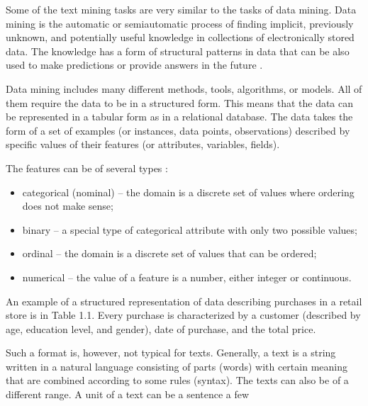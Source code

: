 Some of the text mining tasks are very similar to the tasks of data mining.
Data mining is the automatic or semiautomatic process of finding implicit, previously unknown, and potentially useful knowledge in collections of electronically
stored data. The knowledge has a form of structural patterns in data that can be
also used to make predictions or provide answers in the future \cite{ref280}.

Data mining includes many different methods, tools, algorithms, or models.
All of them require the data to be in a structured form. This means that the data
can be represented in a tabular form as in a relational database. The data takes
the form of a set of examples (or instances, data points, observations) described
by specific values of their features (or attributes, variables, fields).

The features can be of several types \cite{ref75,ref174}:

\begin{itemize}
    \item categorical (nominal) – the domain is a discrete set of values where ordering does not make sense;

    \item binary – a special type of categorical attribute with only two possible values;

    \item ordinal – the domain is a discrete set of values that can be ordered;

    \item numerical – the value of a feature is a number, either integer or continuous.
\end{itemize}

An example of a structured representation of data describing purchases in
a retail store is in Table 1.1. Every purchase is characterized by a customer (described by age, education level, and gender), date of purchase, and the total price.

Such a format is, however, not typical for texts. Generally, a text is a string
written in a natural language consisting of parts (words) with certain meaning
that are combined according to some rules (syntax). The texts can also be of a
different range. A unit of a text can be a sentence a few

